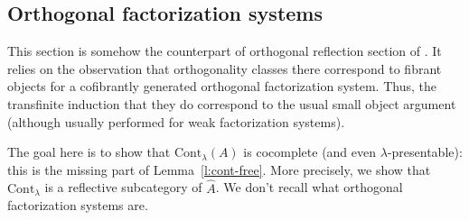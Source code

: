 \documentclass{article}
\newcommand{\Cont}[1]{\text{Cont}_{#1}}
\begin{document}
\subsection{Orthogonal factorization systems}
\label{ss:ortho}
This section is somehow the counterpart of
orthogonal reflection section of \cite{adamek_rosicky}.
It relies on the observation that orthogonality classes there correspond
to fibrant objects for a cofibrantly generated orthogonal factorization system.
Thus, the transfinite induction that they do correspond to the usual small
object argument (although usually performed for weak factorization systems).

The goal here is to show that $\Cont\lambda(A)$ is cocomplete (and even
$\lambda$-presentable): this is the missing part of Lemma~\ref{l:cont-free}.
More precisely, we show that $\Cont\lambda$ is a reflective subcategory of $\hat{A}$.
We don't recall what orthogonal factorization systems are.
\end{document}
